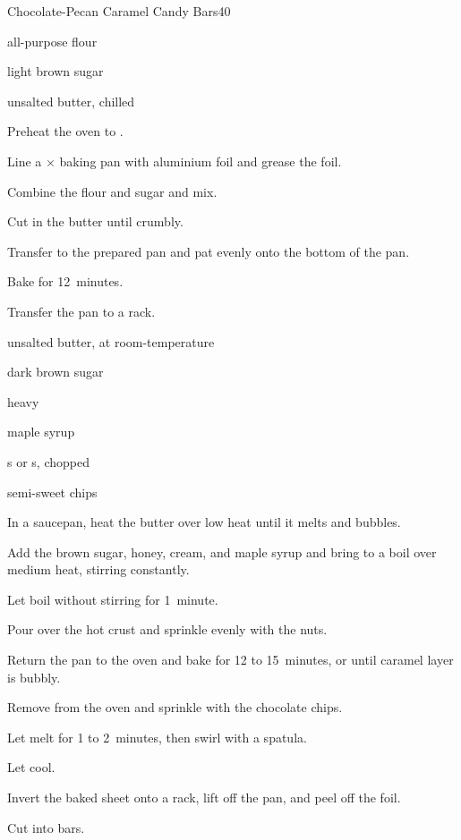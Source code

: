 \begin{recipe}{Chocolate-Pecan Caramel Candy Bars}{}{40}


\begin{ingredients}
\item \C{1 \half} all-purpose flour
\item \C{\half} light brown sugar
\item \C{\half} unsalted butter, chilled
\end{ingredients}

\begin{directions}
\item Preheat the oven to .
\item Line a $\times$ baking pan with aluminium foil and grease the foil.
\item Combine the flour and sugar and mix.
\item Cut in the butter until crumbly.
\item Transfer to the prepared pan and pat evenly onto the bottom of the pan.
\item Bake for 12~minutes.
\item Transfer the pan to a rack.
\end{directions}


\begin{ingredients}
\item {} unsalted butter, at room-temperature
\item {} dark brown sugar
\item {} 
\item {} heavy 
\item {} maple syrup
\item \C{1 \half} s or s, chopped
\item \C{\half} semi-sweet  chips
\end{ingredients}

\begin{directions}
\item In a saucepan, heat the butter over low heat until it melts and bubbles.
\item Add the brown sugar, honey, cream, and maple syrup and bring to a boil over medium heat, stirring constantly.
\item Let boil without stirring for 1~minute.
\item Pour over the hot crust and sprinkle evenly with the nuts.
\item Return the pan to the oven and bake for 12 to 15~minutes, or until caramel layer is bubbly.
\item Remove from the oven and sprinkle with the chocolate chips.
\item Let melt for 1 to 2~minutes, then swirl with a spatula.
\item Let cool.
\item Invert the baked sheet onto a rack, lift off the pan, and peel off the foil.
\item Cut into bars.
\end{directions}

\end{recipe}
